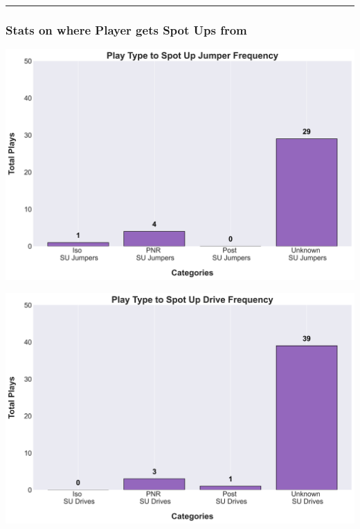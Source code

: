 \documentclass[a4paper,12pt]{article}
\begin{document}
\vspace{-1em} %
\hrule height 1pt width 1\textwidth %
\vspace{1 em} %

\subsubsection{Stats on where Player gets Spot Ups from}

\begin{table}[H]
    \centering
    \begin{minipage}[c]{0.45\textwidth} %
        \centering
        \includegraphics[width=.8\textwidth, height=0.15\textheight]{images/SpotUp_PlayTypeShots_Freq.png} %
    \end{minipage}
    \hfill %
    \begin{minipage}[c]{0.45\textwidth} %
        \centering
        \includegraphics[width=.8\textwidth, height=0.15\textheight]{images/SpotUp_PlayTypeDrives_Freq.png} %
    \end{minipage}
\end{table}
\end{document}
